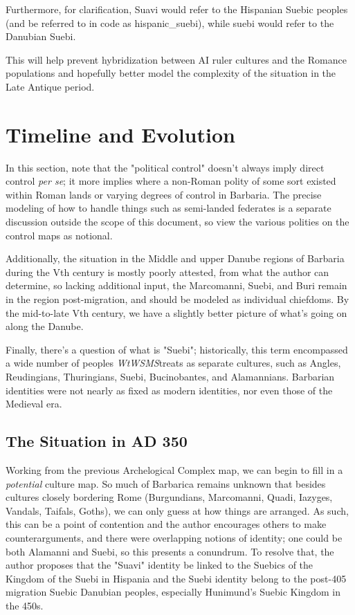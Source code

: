 \documentclass{article}
\newcommand{\wtwsms}{\textit{WtWSMS}}
\begin{document}
	Furthermore, for clarification, Suavi would refer to the Hispanian Suebic peoples (and be referred to in code as hispanic\_suebi), while suebi would refer to the Danubian Suebi.
	
	This will help prevent hybridization between AI ruler cultures and the Romance populations and hopefully better model the complexity of the situation in the Late Antique period.
	
	\newpage
	\section{Timeline and Evolution}
	\label{sec:timeline}
	
	In this section, note that the "political control" doesn't always imply direct control \textit{per se}; it more implies where a non-Roman polity of some sort existed within Roman lands or varying degrees of control in Barbaria.
	The precise modeling of how to handle things such as semi-landed federates is a separate discussion outside the scope of this document, so view the various polities on the control maps as notional.
	
	Additionally, the situation in the Middle and upper Danube regions of Barbaria during the Vth century is mostly poorly attested, from what the author can determine, so lacking additional input, the Marcomanni, Suebi, and Buri remain in the region post-migration, and should be modeled as individual chiefdoms. 
	By the mid-to-late Vth century, we have a slightly better picture of what's going on along the Danube.
	
	Finally, there's a question of what is "Suebi"; historically, this term encompassed a wide number of peoples \wtwsms treats as separate cultures, such as Angles, Reudingians, Thuringians, Suebi, Bucinobantes, and Alamannians.
	Barbarian identities were not nearly as fixed as modern identities, nor even those of the Medieval era. 
	
	\subsection{The Situation in AD 350}
	\label{sec:timeline:subsec:350}
	
	Working from the previous Archelogical Complex map, we can begin to fill in a \textit{potential} culture map.
	So much of Barbarica remains unknown that besides cultures closely bordering Rome (Burgundians, Marcomanni, Quadi, Iazyges, Vandals, Taifals, Goths), we can only guess at how things are arranged.
	As such, this can be a point of contention and the author encourages others to make counterarguments, and there were overlapping notions of identity; one could be both Alamanni and Suebi, so this presents a conundrum.
	To resolve that, the author proposes that the "Suavi" identity be linked to the Suebics of the Kingdom of the Suebi in Hispania and the Suebi identity belong to the post-405 migration Suebic Danubian peoples, especially Hunimund's Suebic Kingdom in the 450s.
	
\end{document}
